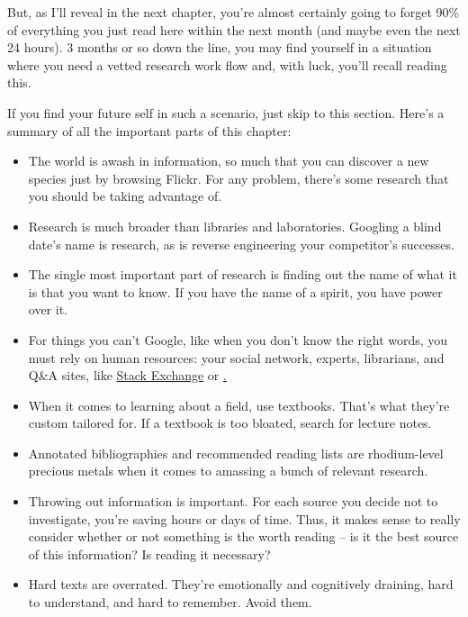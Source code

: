 But, as I'll reveal in the next chapter, you're almost certainly going to forget
90\% of everything you just read here within the next month (and maybe even the next 24 hours). 3 months or so down
the line, you may find yourself in a situation where you need a vetted research
work flow and, with luck, you'll recall reading this.

If you find your future self in such a scenario, just skip to this
section. Here's a summary of all the important parts of this chapter:

\begin{itemize}
\item The world is awash in information, so much that you can discover a new species
just by browsing Flickr. For any problem, there's some research that you should
be taking advantage of.

\item Research is much broader than libraries and laboratories. Googling a blind
date's name is research, as is reverse engineering your competitor's successes.

\item The single most important part of research is finding out the name of what it
is that you want to know. If you have the name of a spirit, you have power over
it.

\item For things you can't Google, like when you don't know the right words, you
must rely on human resources: your social network, experts, librarians, and Q\&A
sites, like \href{http://stackexchange.com/sites}{Stack Exchange} or \href{Quora}.

\item When it comes to learning about a field, use textbooks. That's what they're
custom tailored for. If a textbook is too bloated, search for lecture notes.

\item Annotated bibliographies and recommended reading lists are rhodium-level
  precious metals when it comes to amassing a bunch of relevant research.

\item Throwing out information is important. For each source you decide not to
investigate, you're saving hours or days of time. Thus, it makes sense to really
consider whether or not something is the worth reading -- is it the best source
of this information? Is reading it necessary?

\item Hard texts are overrated. They're emotionally and cognitively draining, hard to
understand, and hard to remember. Avoid them.


\end{itemize}
